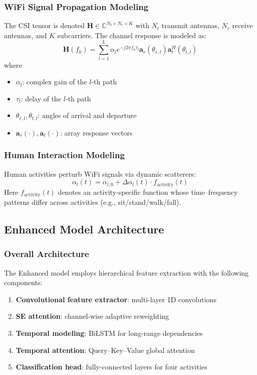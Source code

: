 \subsubsection{WiFi Signal Propagation Modeling}
The CSI tensor is denoted $\mathbf{H} \in \mathbb{C}^{N_t \times N_r \times K}$ with $N_t$ transmit antennas, $N_r$ receive antennas, and $K$ subcarriers. The channel response is modeled as:
\begin{equation}
\mathbf{H}(f_k) = \sum_{l=1}^{L} \alpha_l e^{-j2\pi f_k \tau_l} \mathbf{a}_r(\theta_{r,l}) \mathbf{a}_t^H(\theta_{t,l})
\label{eq:channel_model}
\end{equation}
where
\begin{itemize}
\item $\alpha_l$: complex gain of the $l$-th path
\item $\tau_l$: delay of the $l$-th path
\item $\theta_{r,l}, \theta_{t,l}$: angles of arrival and departure
\item $\mathbf{a}_r(\cdot), \mathbf{a}_t(\cdot)$: array response vectors
\end{itemize}

\subsubsection{Human Interaction Modeling}
Human activities perturb WiFi signals via dynamic scatterers:
\begin{equation}
\alpha_l(t) = \alpha_{l,0} + \Delta\alpha_l(t) \cdot f_{\text{activity}}(t)
\label{eq:human_interaction}
\end{equation}
Here $f_{\text{activity}}(t)$ denotes an activity-specific function whose time–frequency patterns differ across activities (e.g., sit/stand/walk/fall).

\subsection{Enhanced Model Architecture}
\label{subsec:enhanced_architecture}

\subsubsection{Overall Architecture}
The Enhanced model employs hierarchical feature extraction with the following components:
\begin{enumerate}
\item \textbf{Convolutional feature extractor}: multi-layer 1D convolutions
\item \textbf{SE attention}: channel-wise adaptive reweighting
\item \textbf{Temporal modeling}: BiLSTM for long-range dependencies
\item \textbf{Temporal attention}: Query–Key–Value global attention
\item \textbf{Classification head}: fully-connected layers for four activities
\end{enumerate}

